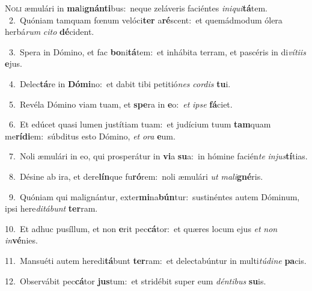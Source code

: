 \lettrine{\initial\textcolor{\initialcolor}{N}}{oli} æmulári in \textbf{ma}\-li\-\textbf{gnán}\-\textbf{ti}bus:~\star neque zeláveris faciéntes \textit{in}\-\textit{i}\textit{qui}\textbf{tá}tem.\\
{\numbfont\textcolor{\numbcolor}{~2.}}~Quóniam tamquam fœnum velóci\textbf{ter} a\-\textbf{ré}\-scent:~\star et quemádmodum ólera herbá\textit{rum} \textit{ci}\-\textit{to} \textbf{dé}\-cident.\par
{\numbfont\textcolor{\numbcolor}{~3.}}~Spera in Dómino, et fac \textbf{bo}\-ni\-\textbf{tá}\-tem:~\star et inhábita terram, et pascéris in di\-\textit{ví}\-\textit{ti}\textit{is} \textbf{e}\-jus.\par
{\numbfont\textcolor{\numbcolor}{~4.}}~Delec\-\textbf{tá}\-re in \textbf{Dó}\-\textbf{mi}no:~\star et dabit tibi petitió\textit{nes} \textit{cor}\-\textit{dis} \textbf{tu}\-i.\par
{\numbfont\textcolor{\numbcolor}{~5.}}~Revéla Dómino viam tuam, et \textbf{spe}\-ra in \textbf{e}\-o:~\star \textit{et} \textit{ip}\-\textit{se} \textbf{fá}\-ciet.\par
{\numbfont\textcolor{\numbcolor}{~6.}}~Et edúcet quasi lumen justítiam tuam:~\dagger et judícium tuum \textbf{tam}\-quam me\-\textbf{rí}\-\textbf{di}em:~\star súbditus esto Dómino, \textit{et} \textit{o}\-\textit{ra} \textbf{e}\-um.\par
{\numbfont\textcolor{\numbcolor}{~7.}}~Noli æmulári in eo, qui prosperátur in \textbf{vi}\-a \textbf{su}\-a:~\star in hómine facién\textit{te} \textit{in}\-\textit{jus}\textbf{tí}tias.\par
{\numbfont\textcolor{\numbcolor}{~8.}}~Désine ab ira, et dere\-\textbf{lín}\-que fu\-\textbf{ró}\-rem:~\star noli æmulári \textit{ut} \textit{ma}\-\textit{li}\textbf{gné}ris.\par
{\numbfont\textcolor{\numbcolor}{~9.}}~Quóniam qui malignántur, exter\-\textbf{mi}\-na\-\textbf{bún}\-tur:~\star sustinéntes autem Dóminum, ipsi here\-\textit{di}\-\textit{tá}\textit{bunt} \textbf{ter}\-ram.\par
{\numbfont\textcolor{\numbcolor}{10.}}~Et adhuc pusíllum, et non \textbf{e}\-rit pec\-\textbf{cá}\-tor:~\star et quæres locum ejus \textit{et} \textit{non} \textit{in}\-\textbf{vé}nies.\par
{\numbfont\textcolor{\numbcolor}{11.}}~Mansuéti autem heredi\-\textbf{tá}\-bunt \textbf{ter}\-ram:~\star et delectabúntur in multi\-\textit{tú}\-\textit{di}\textit{ne} \textbf{pa}\-cis.\par
{\numbfont\textcolor{\numbcolor}{12.}}~Observábit pec\-\textbf{cá}\-tor \textbf{jus}\-tum:~\star et stridébit super eum \textit{dén}\-\textit{ti}\textit{bus} \textbf{su}\-is.\par
